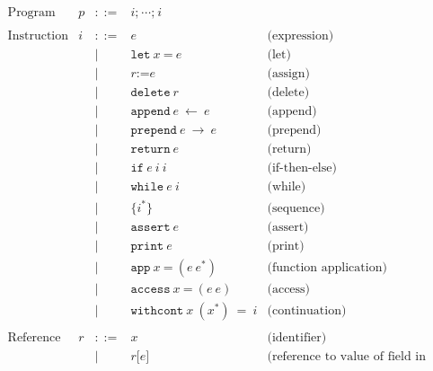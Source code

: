 \documentclass[11pt]{article}
\newcommand{\Term}[1]{\texttt{#1}}
\begin{document}
\[
\begin{array}{rrrll}
\text{Program} & p & ::= & i\Term{;}\ \cdots \Term{;}\ i & \\
\\

\text{Instruction} & i & ::= & e & \text{(expression)} \\
&&|& \Term{let}\ x\ \Term{=}\ e & \text{(let)}\\
&&|& r \Term{:=} e & \text{(assign)}\\
&&|& \Term{delete}\ r & \text{(delete)}\\
&&|& \Term{append}\ e\ \gets\ e & \text{(append)}\\
&&|& \Term{prepend}\ e\ \to\ e & \text{(prepend)}\\
&&|& \Term{return}\ e & \text{(return)}\\
&&|& \Term{if}\ e\ i\ i\ & \text{(if-then-else)}\\
&&|& \Term{while}\ e\ i & \text{(while)}\\
&&|& \{ i^* \} & \text{(sequence)}\\
&&|& \Term{assert}\ e & \text{(assert)}\\
&&|& \Term{print}\ e & \text{(print)}\\
&&|& \Term{app}\ x\ \Term{=}\ (e\ e^*) & \text{(function application)}\\
&&|& \Term{access}\ x\ \Term{=}\ (e\ e) & \text{(access)}\\
&&|& \Term{withcont}\ x\ (x^*)\ =\ i & \text{(continuation)}\\ 
\\

\text{Reference} & r & ::= & x & \text{(identifier)}\\
&&|& r\Term{[} e \Term{]} & \text{(reference to value of field in heap)}\\
\\
\end{array}
\]

\newpage
\end{document}
